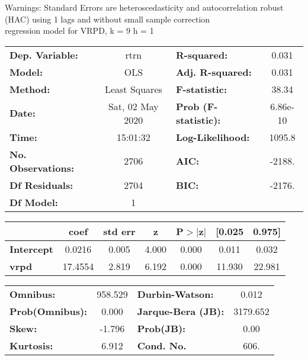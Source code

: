 Warnings: \newline
 [1] Standard Errors are heteroscedasticity and autocorrelation robust (HAC) using 1 lags and without small sample correction\\ 

regression model for VRPD, k = 9 h = 1\begin{center}
\begin{tabular}{lclc}
\toprule
\textbf{Dep. Variable:}    &       rtrn       & \textbf{  R-squared:         } &     0.031   \\
\textbf{Model:}            &       OLS        & \textbf{  Adj. R-squared:    } &     0.031   \\
\textbf{Method:}           &  Least Squares   & \textbf{  F-statistic:       } &     38.34   \\
\textbf{Date:}             & Sat, 02 May 2020 & \textbf{  Prob (F-statistic):} &  6.86e-10   \\
\textbf{Time:}             &     15:01:32     & \textbf{  Log-Likelihood:    } &    1095.8   \\
\textbf{No. Observations:} &        2706      & \textbf{  AIC:               } &    -2188.   \\
\textbf{Df Residuals:}     &        2704      & \textbf{  BIC:               } &    -2176.   \\
\textbf{Df Model:}         &           1      & \textbf{                     } &             \\
\bottomrule
\end{tabular}
\begin{tabular}{lcccccc}
                   & \textbf{coef} & \textbf{std err} & \textbf{z} & \textbf{P$> |$z$|$} & \textbf{[0.025} & \textbf{0.975]}  \\
\midrule
\textbf{Intercept} &       0.0216  &        0.005     &     4.000  &         0.000        &        0.011    &        0.032     \\
\textbf{vrpd}      &      17.4554  &        2.819     &     6.192  &         0.000        &       11.930    &       22.981     \\
\bottomrule
\end{tabular}
\begin{tabular}{lclc}
\textbf{Omnibus:}       & 958.529 & \textbf{  Durbin-Watson:     } &    0.012  \\
\textbf{Prob(Omnibus):} &   0.000 & \textbf{  Jarque-Bera (JB):  } & 3179.652  \\
\textbf{Skew:}          &  -1.796 & \textbf{  Prob(JB):          } &     0.00  \\
\textbf{Kurtosis:}      &   6.912 & \textbf{  Cond. No.          } &     606.  \\
\bottomrule
\end{tabular}
\end{center}

